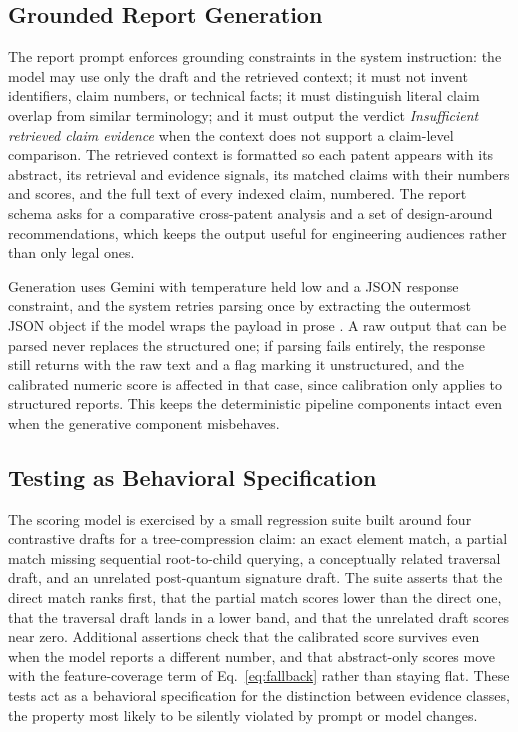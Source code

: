 \documentclass[journal]{IEEEtran}
\begin{document}
\subsection{Grounded Report Generation}
The report prompt enforces grounding constraints in the system instruction: the model may use only the draft and the retrieved context; it must not invent identifiers, claim numbers, or technical facts; it must distinguish literal claim overlap from similar terminology; and it must output the verdict \emph{Insufficient retrieved claim evidence} when the context does not support a claim-level comparison. The retrieved context is formatted so each patent appears with its abstract, its retrieval and evidence signals, its matched claims with their numbers and scores, and the full text of every indexed claim, numbered. The report schema asks for a comparative cross-patent analysis and a set of design-around recommendations, which keeps the output useful for engineering audiences rather than only legal ones.

Generation uses Gemini with temperature held low and a JSON response constraint, and the system retries parsing once by extracting the outermost JSON object if the model wraps the payload in prose \cite{google2025gemini}. A raw output that can be parsed never replaces the structured one; if parsing fails entirely, the response still returns with the raw text and a flag marking it unstructured, and the calibrated numeric score is affected in that case, since calibration only applies to structured reports. This keeps the deterministic pipeline components intact even when the generative component misbehaves.

\subsection{Testing as Behavioral Specification}
The scoring model is exercised by a small regression suite built around four contrastive drafts for a tree-compression claim: an exact element match, a partial match missing sequential root-to-child querying, a conceptually related traversal draft, and an unrelated post-quantum signature draft. The suite asserts that the direct match ranks first, that the partial match scores lower than the direct one, that the traversal draft lands in a lower band, and that the unrelated draft scores near zero. Additional assertions check that the calibrated score survives even when the model reports a different number, and that abstract-only scores move with the feature-coverage term of Eq.~\eqref{eq:fallback} rather than staying flat. These tests act as a behavioral specification for the distinction between evidence classes, the property most likely to be silently violated by prompt or model changes.
\end{document}
